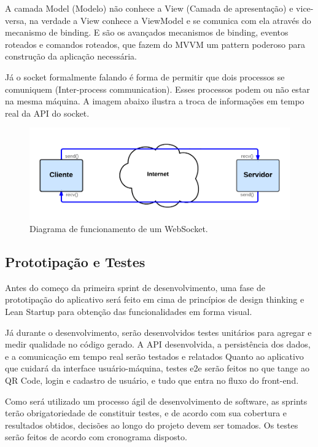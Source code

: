     A camada Model (Modelo) não conhece a View (Camada de apresentação) e vice-versa, na verdade a View conhece a ViewModel e se comunica com ela através do mecanismo de binding. E são os avançados mecanismos de binding, eventos roteados e comandos roteados, que fazem do MVVM um pattern poderoso para construção da aplicação necessária.

    Já o socket formalmente falando é forma de permitir que dois processos se comuniquem (Inter-process communication). Esses processos podem ou não estar na mesma máquina. A imagem abaixo ilustra a troca de informações em tempo real da API do socket.

\begin{figure}[!ht]
	\centering
		\includegraphics[scale=0.5]{figuras/socket}
	\caption{Diagrama de funcionamento de um WebSocket.}
\end{figure}

\subsection{Prototipação e Testes}

    Antes do começo da primeira sprint de desenvolvimento, uma fase de prototipação do aplicativo será feito em cima de princípios de design thinking e Lean Startup para obtenção das funcionalidades em forma visual.

    Já durante o desenvolvimento, serão desenvolvidos testes unitários para agregar e medir qualidade no código gerado. A API desenvolvida, a persistência dos dados, e a comunicação em tempo real serão testados e relatados Quanto ao aplicativo que cuidará da interface usuário-máquina, testes e2e serão feitos no que tange ao QR Code, login e cadastro de usuário, e tudo que entra no fluxo do front-end.

	Como será utilizado um processo ágil de desenvolvimento de software, as sprints terão obrigatoriedade de constituir testes, e de acordo com sua cobertura e resultados obtidos, decisões ao longo do projeto devem ser tomados. Os testes serão feitos de acordo com cronograma disposto.

